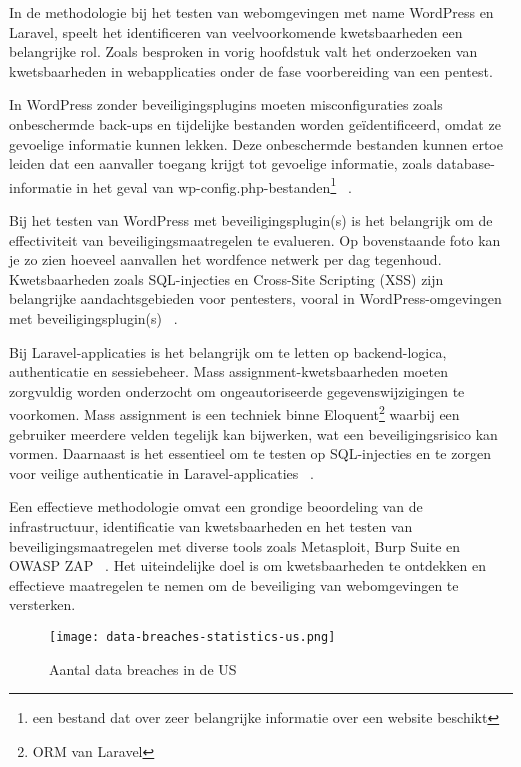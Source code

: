 In de methodologie bij het testen van webomgevingen met name WordPress en Laravel, speelt het identificeren van veelvoorkomende 
kwetsbaarheden een belangrijke rol. Zoals besproken in vorig hoofdstuk valt het onderzoeken van kwetsbaarheden in webapplicaties onder 
de fase voorbereiding van een pentest.

In WordPress zonder beveiligingsplugins moeten misconfiguraties zoals onbeschermde back-ups 
en tijdelijke bestanden worden geïdentificeerd, omdat ze gevoelige informatie kunnen lekken. Deze onbeschermde bestanden kunnen 
ertoe leiden dat een aanvaller toegang krijgt tot gevoelige informatie, zoals database-informatie in het geval van 
wp-config.php-bestanden\footnote{een bestand dat over zeer belangrijke informatie over een website beschikt} 
~\autocite{DalalanaBertoglio2017}.

Bij het testen van WordPress met beveiligingsplugin(s) is het belangrijk om de effectiviteit van beveiligingsmaatregelen te 
evalueren. Op bovenstaande foto kan je zo zien hoeveel aanvallen het wordfence netwerk per dag tegenhoud. Kwetsbaarheden 
zoals SQL-injecties en Cross-Site Scripting (XSS) zijn belangrijke aandachtsgebieden voor pentesters, vooral in WordPress-omgevingen 
met beveiligingsplugin(s) ~\autocite{Albahar2022}.

Bij Laravel-applicaties is het belangrijk om te letten op backend-logica, authenticatie en sessiebeheer. 
Mass assignment-kwetsbaarheden moeten zorgvuldig worden onderzocht om ongeautoriseerde gegevenswijzigingen te voorkomen.
Mass assignment is een techniek binne Eloquent\footnote{ORM van Laravel} waarbij een gebruiker meerdere velden tegelijk kan bijwerken, wat een beveiligingsrisico kan vormen. 
Daarnaast is het essentieel om te testen op SQL-injecties en te zorgen voor veilige authenticatie in Laravel-applicaties 
~\autocite{Altulaihan2023}.

Een effectieve methodologie omvat een grondige beoordeling van de infrastructuur, identificatie van kwetsbaarheden en het 
testen van beveiligingsmaatregelen met diverse tools zoals Metasploit, Burp Suite en OWASP ZAP ~\autocite{Ravindran2022}. 
Het uiteindelijke doel is om kwetsbaarheden te ontdekken en effectieve maatregelen te nemen om de beveiliging van webomgevingen 
te versterken.

\begin{figure}
    \centering
    \texttt{[image: data-breaches-statistics-us.png]}
    \caption[Aantal data breaches in de US ]{Aantal data breaches in de US }
\end{figure}

